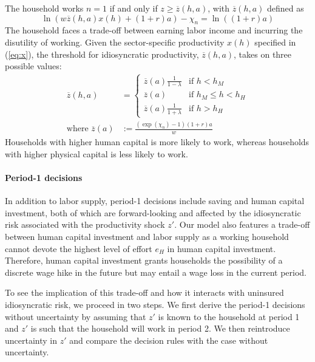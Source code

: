 \documentclass[12pt]{article}
\begin{document}
The household works $n=1$ if and only if $z\geq\overline{z}(h,a)$, with $\overline{z}(h,a) $ defined as 
\begin{equation}
    \ln(w\overline{z}(h,a)x(h)+(1+r)a)-\chi_n = \ln((1+r)a)
\end{equation}
The household faces a trade-off between earning labor income and incurring the disutility of working. 
Given the sector-specific productivity $x(h)$ specified in (\ref{eq:x}), the threshold for idiosyncratic productivity, $\overline{z}(h,a)$, takes on three possible values:
\begin{align}
    \label{eq:z-period2}
\overline{z}(h,a)&=\left \{ 
\begin{array}{cl}
\overline{z}(a)\frac{1}{1-\lambda}  & \text{if }h<h_{M} \\ 
\overline{z}(a) & \text{if }h_{M} \leq h<h_{H} \\ 
\overline{z}(a)\frac{1}{1+\lambda}   & \text{if }h>h_{H}%
\end{array}%
\right. \\
\text{where }\overline{z}(a)&:=\frac{(\exp(\chi_n)-1)(1+r)a}{w}
\end{align}
Households with higher human capital is more likely to work, whereas households with higher physical capital is less likely to work. 

\paragraph{Period-1 decisions}\label{sec:period1}
In addition to labor supply, period-1 decisions include saving and human capital investment, both of which are forward-looking and affected by the idiosyncratic risk associated with the productivity shock $z'$. 
Our model also features a trade-off between human capital investment and labor supply as a working household cannot devote the highest level of effort $e_H$ in human capital investment. Therefore, human capital investment grants households the possibility of a discrete wage hike in the future but may entail a wage loss in the current period. 

To see the implication of this trade-off and how it interacts with uninsured idiosyncratic risk, we proceed in two steps. We first derive the period-1 decisions without uncertainty by assuming that $z'$ is known to the household at period 1 and $z'$ is such that the household will work in period 2. We then reintroduce uncertainty in $z'$ and compare the decision rules with the case without uncertainty.
\end{document}
